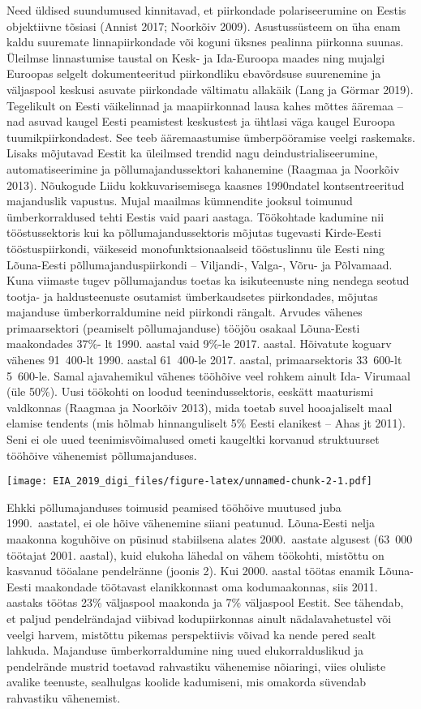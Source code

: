 \documentclass[]{book}
\begin{document}
Need üldised suundumused kinnitavad, et piirkondade polariseerumine on Eestis objektiivne tõsiasi (Annist
2017; Noorkõiv 2009). Asustussüsteem on üha enam kaldu suuremate linnapiirkondade või koguni üksnes
pealinna piirkonna suunas. Üleilmse linnastumise taustal on Kesk- ja Ida-Euroopa maades ning mujalgi
Euroopas selgelt dokumenteeritud piirkondliku ebavõrdsuse suurenemine ja väljaspool keskusi asuvate
piirkondade vältimatu allakäik (Lang ja Görmar 2019). Tegelikult on Eesti väikelinnad ja maapiirkonnad lausa
kahes mõttes ääremaa -- nad asuvad kaugel Eesti peamistest keskustest ja ühtlasi väga kaugel Euroopa
tuumikpiirkondadest. See teeb ääremaastumise ümberpööramise veelgi raskemaks.
Lisaks mõjutavad Eestit ka üleilmsed trendid nagu deindustrialiseerumine, automatiseerimine ja
põllumajandussektori kahanemine (Raagmaa ja Noorkõiv 2013). Nõukogude Liidu kokkuvarisemisega
kaasnes 1990ndatel kontsentreeritud majanduslik vapustus. Mujal maailmas kümnendite jooksul toimunud
ümberkorraldused tehti Eestis vaid paari aastaga. Töökohtade kadumine nii tööstussektoris kui ka
põllumajandussektoris mõjutas tugevasti Kirde-Eesti tööstuspiirkondi, väikeseid monofunktsionaalseid
tööstuslinnu üle Eesti ning Lõuna-Eesti põllumajanduspiirkondi -- Viljandi-, Valga-, Võru- ja Põlvamaad. Kuna
viimaste tugev põllumajandus toetas ka isikuteenuste ning nendega seotud tootja- ja haldusteenuste
osutamist ümberkaudsetes piirkondades, mõjutas majanduse ümberkorraldumine neid piirkondi rängalt.
Arvudes vähenes primaarsektori (peamiselt põllumajanduse) tööjõu osakaal Lõuna-Eesti maakondades 37\%-
lt 1990. aastal vaid 9\%-le 2017. aastal. Hõivatute koguarv vähenes 91~400-lt 1990. aastal 61~400-le 2017.
aastal, primaarsektoris 33~600-lt 5~600-le. Samal ajavahemikul vähenes tööhõive veel rohkem ainult Ida-
Virumaal (üle 50\%). Uusi töökohti on loodud teenindussektoris, eeskätt maaturismi valdkonnas (Raagmaa ja
Noorkõiv 2013), mida toetab suvel hooajaliselt maal elamise tendents (mis hõlmab hinnanguliselt 5\% Eesti
elanikest -- Ahas jt 2011). Seni ei ole uued teenimisvõimalused ometi kaugeltki korvanud struktuurset
tööhõive vähenemist põllumajanduses.

\texttt{[image: EIA\_2019\_digi\_files/figure-latex/unnamed-chunk-2-1.pdf]}

Ehkki põllumajanduses toimusid peamised tööhõive muutused juba 1990.~aastatel, ei ole hõive vähenemine
siiani peatunud. Lõuna-Eesti nelja maakonna koguhõive on püsinud stabiilsena alates 2000.~aastate algusest
(63~000 töötajat 2001. aastal), kuid elukoha lähedal on vähem töökohti, mistõttu on kasvanud tööalane
pendelränne (joonis 2). Kui 2000. aastal töötas enamik Lõuna-Eesti maakondade töötavast elanikkonnast
oma kodumaakonnas, siis 2011. aastaks töötas 23\% väljaspool maakonda ja 7\% väljaspool Eestit. See
tähendab, et paljud pendelrändajad viibivad kodupiirkonnas ainult nädalavahetustel või veelgi harvem,
mistõttu pikemas perspektiivis võivad ka nende pered sealt lahkuda. Majanduse ümberkorraldumine ning
uued elukorralduslikud ja pendelrände mustrid toetavad rahvastiku vähenemise nõiaringi, viies oluliste
avalike teenuste, sealhulgas koolide kadumiseni, mis omakorda süvendab rahvastiku vähenemist.
\end{document}
